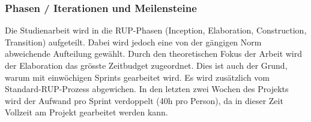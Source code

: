 \subsubsection{Phasen / Iterationen und Meilensteine}
\label{Zeitplanung:Phasen / Iterationen und Meilensteine}

Die Studienarbeit wird in die \ac{RUP}-Phasen (Inception, Elaboration, Construction, Transition) aufgeteilt.
Dabei wird jedoch eine von der gängigen Norm abweichende Aufteilung gewählt.
Durch den theoretischen Fokus der Arbeit wird der Elaboration das grösste Zeitbudget zugeordnet.
Dies ist auch der Grund, warum mit einwöchigen Sprints gearbeitet wird.
Es wird zusätzlich vom Standard-\ac{RUP}-Prozess abgewichen.
In den letzten zwei Wochen des Projekts wird der Aufwand pro Sprint verdoppelt (40h pro Person), da in dieser Zeit Vollzeit am Projekt gearbeitet werden kann.

